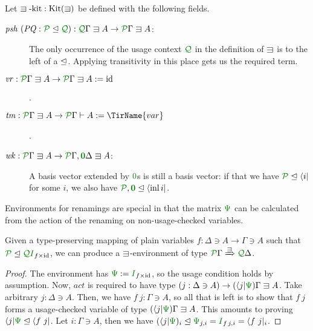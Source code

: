 \documentclass[submission,copyright,creativecommons]{eptcs}
\begin{document}
\begin{definition}\label{def:lvar-kit}
  Let $\lvar\textrm{-kit} : \kit(\lvar)$ be defined with the following
  fields.
  \begin{description}
    \item[$\mathit{psh}~(\mathit{PQ} : \resctx P \subres \resctx Q)
      : \ctx{\Gamma}{Q} \lvar A \to \ctx{\Gamma}{P} \lvar A$:]
      The only occurrence of the usage context $\resctx Q$ in the definition of
      $\lvar$ is to the left of a $\trianglelefteq$.
      Applying transitivity in this place gets us the required term.
    \item[$\mathit{vr} : \ctx{\Gamma}{P} \lvar A \to \ctx{\Gamma}{P} \lvar A
      := \mathrm{id}$].
    \item[$\mathit{tm} : \ctx{\Gamma}{P} \lvar A \to \ctx{\Gamma}{P} \vdash A
      := \TirName{var}$].
    \item[$\mathit{wk} : \ctx{\Gamma}{P} \lvar A
      \to \ctx{\Gamma}{P}, \ctx{\Delta}{\vct 0} \lvar A$:]
      A basis vector extended by $\rescomment 0$s is still a basis
      vector: if that we have $\resctx P \subres \langle i \rvert$ for some $i$,
      we also have
      $\resctx P, \rescomment{\vct 0} \subres \langle \inl i \rvert$.
  \end{description}
\end{definition}

Environments for renamings are special in that the matrix $\rescomment\Psi$ can
be calculated from the action of the renaming on non-usage-checked variables.

\begin{lemma}\label{lem:ren-env}
  Given a type-preserving mapping of plain variables
  $f : \Delta \ni A \to \Gamma \ni A$ such that
  $\resctx P \subres \resctx Q\rescomment I_{f\times\id}$,
  we can produce a $\lvar$-environment of type
  $\ctx{\Gamma}{P} \subst{\lvar} \ctx{\Delta}{Q}$.
\end{lemma}
\begin{proof}
  The environment has $\rescomment\Psi := \rescomment I_{f\times\id}$,
  so the usage condition holds by assumption.
  Now, $\mathit{act}$ is required to have type
  $(j : \Delta \ni A) \to (\langle j \rvert\rescomment\Psi)\Gamma \lvar A$.
  Take arbitrary $j : \Delta \ni A$.
  Then, we have $f~j : \Gamma \ni A$, so all that is left is to show that $f~j$
  forms a usage-checked variable of type
  $(\langle j \rvert\rescomment\Psi)\Gamma \lvar A$.
  This amounts to proving
  $\langle j \rvert\rescomment\Psi \subres \langle f~j \rvert$.
  Let $i : \Gamma \ni A$, then we have
    $(\langle j \rvert\rescomment\Psi)_i
    \subres \rescomment\Psi_{j,i}
    = \rescomment I_{f\,j,i}
    = \langle f~j \rvert_i$.
\end{proof}
\end{document}
